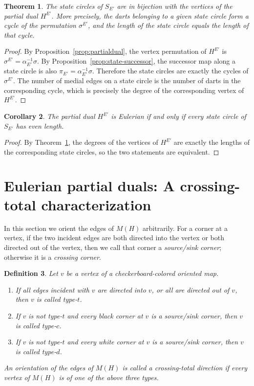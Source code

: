 \documentclass{article}
\newtheorem{theorem}{Theorem}[section]
\newtheorem{corollary}[theorem]{Corollary}
\newtheorem{definition}[theorem]{Definition}
\begin{document}
\begin{theorem}\label{thm:state-vertex}
The state circles of $S_{E'}$ are in bijection with the vertices of the partial dual $H^{E'}$. More precisely, the darts belonging to a given state circle form a cycle of the permutation $\sigma^{E'}$, and the length of the state circle equals the length of that cycle.
\end{theorem}

\begin{proof}
By Proposition~\ref{prop:partialdual}, the vertex permutation of $H^{E'}$ is \(\sigma^{E'}=\alpha_{E'}^{-1}\sigma\). By Proposition~\ref{prop:state-successor}, the successor map along a state circle is also $\pi_{E'}=\alpha_{E'}^{-1}\sigma$. Therefore the state circles are exactly the cycles of $\sigma^{E'}$. The number of medial edges on a state circle is the number of darts in the corresponding cycle, which is precisely the degree of the corresponding vertex of $H^{E'}$.
\end{proof}

\begin{corollary}\label{cor:even-state}
The partial dual $H^{E'}$ is Eulerian if and only if every state circle of $S_{E'}$ has even length.
\end{corollary}

\begin{proof}
By Theorem~\ref{thm:state-vertex}, the degrees of the vertices of $H^{E'}$ are exactly the lengths of the corresponding state circles, so the two statements are equivalent.
\end{proof}



\section{Eulerian partial duals: A crossing-total characterization}

In this section we orient the edges of $M(H)$ arbitrarily. For a corner at a vertex, if the two incident edges are both directed into the vertex or both directed out of the vertex, then we call that corner a \emph{source/sink corner}; otherwise it is a \emph{crossing corner}.

\begin{definition}\label{def:crossing-total}
Let $v$ be a vertex of a checkerboard-colored oriented map.
\begin{enumerate}
  \item If all edges incident with $v$ are directed into $v$, or all are directed out of $v$, then $v$ is called \emph{type-$t$}.
  \item If $v$ is not type-$t$ and every black corner at $v$ is a source/sink corner, then $v$ is called \emph{type-$c$}.
  \item If $v$ is not type-$t$ and every white corner at $v$ is a source/sink corner, then $v$ is called \emph{type-$d$}.
\end{enumerate}
An orientation of the edges of $M(H)$ is called a \emph{crossing-total direction} if every vertex of $M(H)$ is of one of the above three types.
\end{definition}
\end{document}
